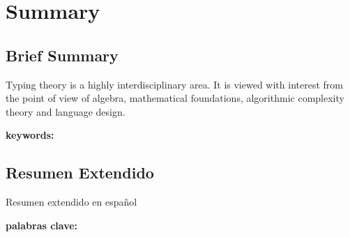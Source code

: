 
\newpage



\chapter*{Summary}
\section*{Brief Summary}

Typing theory is a highly interdisciplinary area. It is viewed with interest from the point of view of algebra, mathematical foundations, algorithmic complexity theory and language design.

\textbf{keywords:} 



\section*{Resumen Extendido}

Resumen extendido en español

\textbf{palabras clave:} 




